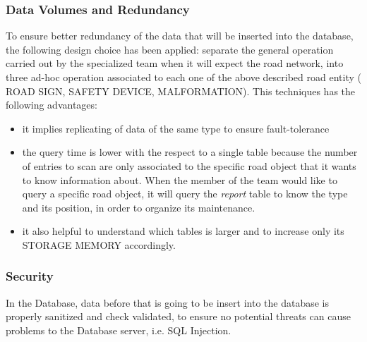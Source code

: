  \subsubsection{Data Volumes and Redundancy}
 To ensure better redundancy of the data that will be inserted into the database, the following design choice has been applied:
 separate the general operation carried out by the specialized team when it will expect the road network, into three ad-hoc operation associated to each one of the above described road entity ( ROAD SIGN, SAFETY DEVICE, MALFORMATION). 
 This techniques has the following advantages:
 \begin{itemize}
     \item it implies replicating of data of the same type to ensure fault-tolerance
      \item the query time is lower with the respect to a single table because the number of entries to scan are only associated to the specific road object that it wants to know information about. When the member of the team would like to query a specific road object, it will query the \textit{report} table to know the type and its position, in order to organize its maintenance.
      \item it also helpful to understand which tables is larger and to increase only its STORAGE MEMORY accordingly.
 \end{itemize}

 \subsubsection{Security}
 In the Database, data before that is going to be insert into the database is properly sanitized and check validated, to ensure no potential threats can cause problems to the Database server, i.e. SQL Injection. 